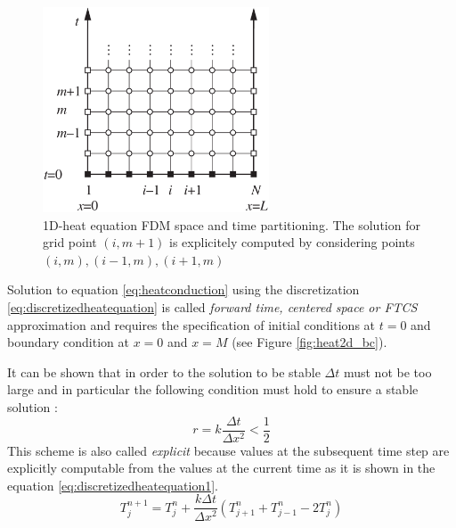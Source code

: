 \begin{figure}
\centering
\includegraphics[width=0.6\textwidth]{./images/CA_FDM/fdmgrid}
\caption[1D-heat equation FDM space and time partitioning]{1D-heat equation FDM space and time partitioning. The solution for  grid point $(i,m+1)$ is explicitely computed by considering points $(i,m),(i-1,m),(i+1,m)$}
\label{fig:heat_equation_time_space_partitioning}
\end{figure}
Solution to equation \ref{eq:heatconduction} using the discretization \ref{eq:discretizedheatequation} is called \textit{forward time, centered space or FTCS} approximation and requires the specification of initial conditions at $t=0$ and boundary condition at $x=0$ and $x=M$ (see Figure \ref{fig:heat2d_bc}).

It can be shown that in order to the solution to be stable $\Delta t$ must not be too large and in particular the following condition must hold to ensure a stable solution \cite{isaacson:1994,anderson:1994,crank:1996}:
\[ 
 r= k \frac{\Delta t}{\Delta x^2}< \frac{1}{2}
\]
This scheme is also called \textit{explicit} because values at the subsequent  time step are explicitly computable from the values at the current time as it is shown in the equation \ref{eq:discretizedheatequation1}.
 \begin{equation}
  T^{n+1}_{j} = T^n_{j} + \frac{k \Delta t}{\Delta x^2} (T^n_{j+1}+T^n_{j-1}-2T^n_{j})
 \label{eq:discretizedheatequation1}
 \end{equation}

